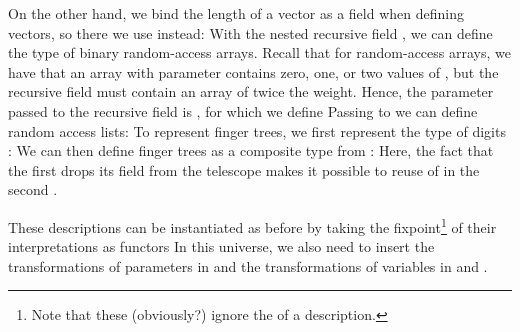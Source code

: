 On the other hand, we bind the length of a vector as a field when defining vectors, so there we use  instead:
With the nested recursive field , we can define the type of binary random-access arrays. Recall that for random-access arrays, we have that an array with parameter  contains zero, one, or two values of , but the recursive field must contain an array of twice the weight. Hence, the parameter passed to the recursive field is , for which we define
Passing  to  we can define random access lists:  
To represent finger trees, we first represent the type of digits : 
We can then define finger trees as a composite type from :
Here, the fact that the first  drops its field from the telescope makes it possible to reuse of  in the second .

These descriptions can be instantiated as before by taking the fixpoint\footnote{Note that these (obviously?) ignore the  of a description.}
of their interpretations as functors
In this universe, we also need to insert the transformations of parameters  in  and the transformations of variables  in  and .


